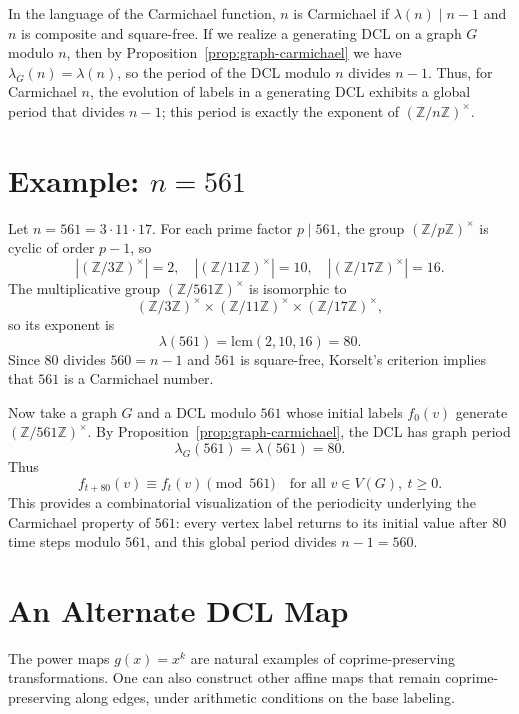 \documentclass[12pt]{amsart}
\theoremstyle{plain}
\theoremstyle{definition}
\theoremstyle{remark}
\numberwithin{equation}{section}
\begin{document}
In the language of the Carmichael function, $n$ is Carmichael if $\lambda(n)\mid n-1$ and $n$ is composite and square-free. If we realize a generating DCL on a graph $G$ modulo $n$, then by Proposition~\ref{prop:graph-carmichael} we have $\lambda_G(n)=\lambda(n)$, so the period of the DCL modulo $n$ divides $n-1$. Thus, for Carmichael $n$, the evolution of labels in a generating DCL exhibits a global period that divides $n-1$; this period is exactly the exponent of $(\mathbb{Z}/n\mathbb{Z})^\times$.

\section{Example: $n=561$}

Let $n=561=3\cdot11\cdot17$. For each prime factor $p\mid 561$, the group $(\mathbb{Z}/p\mathbb{Z})^\times$ is cyclic of order $p-1$, so
\[
|(\mathbb{Z}/3\mathbb{Z})^\times|=2,\quad
|(\mathbb{Z}/11\mathbb{Z})^\times|=10,\quad
|(\mathbb{Z}/17\mathbb{Z})^\times|=16.
\]
The multiplicative group $(\mathbb{Z}/561\mathbb{Z})^\times$ is isomorphic to
\[
(\mathbb{Z}/3\mathbb{Z})^\times \times (\mathbb{Z}/11\mathbb{Z})^\times \times (\mathbb{Z}/17\mathbb{Z})^\times,
\]
so its exponent is
\[
\lambda(561)=\mathrm{lcm}(2,10,16)=80.
\]
Since $80$ divides $560=n-1$ and $561$ is square-free, Korselt's criterion implies that $561$ is a Carmichael number.

Now take a graph $G$ and a DCL modulo $561$ whose initial labels $f_0(v)$ generate $(\mathbb{Z}/561\mathbb{Z})^\times$. By Proposition~\ref{prop:graph-carmichael}, the DCL has graph period
\[
\lambda_G(561)=\lambda(561)=80.
\]
Thus
\[
f_{t+80}(v)\equiv f_t(v)\pmod{561}\quad\text{for all }v\in V(G),\ t\ge0.
\]
This provides a combinatorial visualization of the periodicity underlying the Carmichael property of $561$: every vertex label returns to its initial value after $80$ time steps modulo $561$, and this global period divides $n-1=560$.

\section*{An Alternate DCL Map}

The power maps $g(x)=x^k$ are natural examples of coprime-preserving transformations. One can also construct other affine maps that remain coprime-preserving along edges, under arithmetic conditions on the base labeling.
\end{document}
